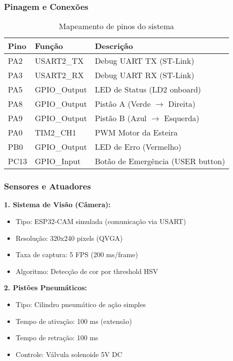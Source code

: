 \documentclass[12pt,a4paper]{article}
\begin{document}
\subsubsection{Pinagem e Conexões}

\begin{table}[H]
\centering
\begin{tabularx}{\textwidth}{llX}
\toprule
\textbf{Pino} & \textbf{Função} & \textbf{Descrição} \\
\midrule
PA2 & USART2\_TX & Debug UART TX (ST-Link) \\
PA3 & USART2\_RX & Debug UART RX (ST-Link) \\
PA5 & GPIO\_Output & LED de Status (LD2 onboard) \\
PA8 & GPIO\_Output & Pistão A (Verde $\rightarrow$ Direita) \\
PA9 & GPIO\_Output & Pistão B (Azul $\rightarrow$ Esquerda) \\
PA0 & TIM2\_CH1 & PWM Motor da Esteira \\
PB0 & GPIO\_Output & LED de Erro (Vermelho) \\
PC13 & GPIO\_Input & Botão de Emergência (USER button) \\
\bottomrule
\end{tabularx}
\caption{Mapeamento de pinos do sistema}
\end{table}

\subsubsection{Sensores e Atuadores}

\textbf{1. Sistema de Visão (Câmera):}
\begin{itemize}
    \item Tipo: ESP32-CAM simulada (comunicação via USART)
    \item Resolução: 320x240 pixels (QVGA)
    \item Taxa de captura: 5 FPS (200 ms/frame)
    \item Algoritmo: Detecção de cor por threshold HSV
\end{itemize}

\textbf{2. Pistões Pneumáticos:}
\begin{itemize}
    \item Tipo: Cilindro pneumático de ação simples
    \item Tempo de ativação: 100 ms (extensão)
    \item Tempo de retração: 100 ms
    \item Controle: Válvula solenoide 5V DC
\end{itemize}
\end{document}
